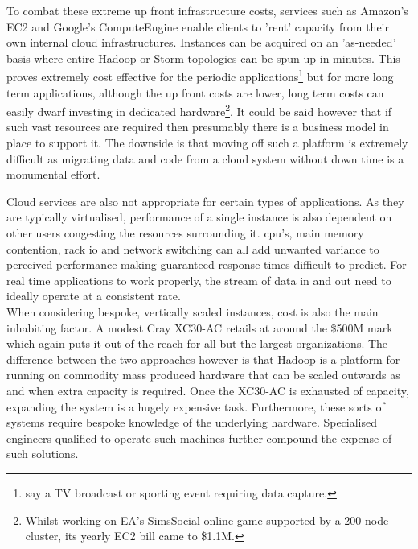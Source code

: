 \documentclass[a4paper,11pt]{scrreprt}
\begin{document}
To combat these extreme up front infrastructure costs, services such as Amazon's EC2 and Google's ComputeEngine enable clients to 'rent' capacity from their own internal cloud infrastructures. Instances can be acquired on an 'as-needed' basis where entire Hadoop or Storm topologies can be spun up in minutes. This proves extremely cost effective for the periodic applications\footnote{say a TV broadcast or sporting event requiring data capture.} but for more long term applications, although the up front costs are lower, long term costs can easily dwarf investing in dedicated hardware\footnote{Whilst working on EA's SimsSocial online game supported by a 200 node cluster, its yearly EC2 bill came to \$1.1M.}. It could be said however that if such vast resources are required then presumably there is a business model in place to support it. The downside is that moving off such a platform is extremely difficult as migrating data and code from a cloud system without down time is a monumental effort.\

Cloud services are also not appropriate for certain types of applications. As they are typically virtualised, performance of a single instance is also dependent on other users congesting the resources surrounding it. \acrshort{cpu}'s, main memory contention, rack \acrshort{io} and network switching can all add unwanted variance to perceived performance making guaranteed response times difficult to predict. For real time applications to work properly, the stream of data in and out need to ideally operate at a consistent rate.\\

When considering bespoke, vertically scaled instances, cost is also the main inhabiting factor. A modest Cray XC30-AC retails at around the \$500M mark which again puts it out of the reach for all but the largest organizations. The difference between the two approaches however is that Hadoop is a platform for running on commodity mass produced hardware that can be scaled outwards as and when extra capacity is required. Once the XC30-AC is exhausted of capacity, expanding the system is a hugely expensive task. Furthermore, these sorts of systems require bespoke knowledge of the underlying hardware. Specialised engineers qualified to operate such machines further compound the expense of such solutions. 
\end{document}
